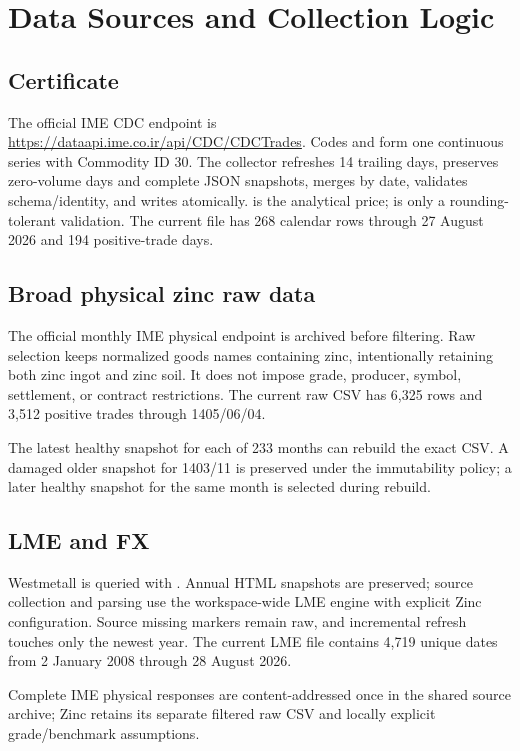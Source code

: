 \documentclass[11pt,a4paper]{article}
\begin{document}
\section{Data Sources and Collection Logic}
\subsection{Certificate}
The official IME CDC endpoint is \url{https://dataapi.ime.co.ir/api/CDC/CDCTrades}.
Codes  and  form one continuous series with Commodity ID 30.
The collector refreshes 14 trailing days, preserves zero-volume days and complete JSON snapshots,
merges by date, validates schema/identity, and writes atomically.  is
the analytical price;  is only a rounding-tolerant validation.
The current file has 268 calendar rows through 27 August 2026 and 194 positive-trade days.

\subsection{Broad physical zinc raw data}
The official monthly IME physical endpoint is archived before filtering. Raw selection keeps
normalized goods names containing zinc, intentionally retaining both zinc ingot and zinc soil.
It does not impose grade, producer, symbol, settlement, or contract restrictions. The current
raw CSV has 6,325 rows and 3,512 positive trades through 1405/06/04.

The latest healthy snapshot for each of 233 months can rebuild the exact CSV. A damaged older
snapshot for 1403/11 is preserved under the immutability policy; a later healthy snapshot for
the same month is selected during rebuild.

\subsection{LME and FX}
Westmetall is queried with . Annual HTML snapshots are preserved; source
collection and parsing use the workspace-wide LME engine with explicit Zinc configuration. Source
missing markers remain raw, and incremental refresh touches only the newest year. The current
LME file contains 4,719 unique dates from 2 January 2008 through 28 August 2026.

Complete IME physical responses are content-addressed once in the shared source archive; Zinc
retains its separate filtered raw CSV and locally explicit grade/benchmark assumptions.
\end{document}
